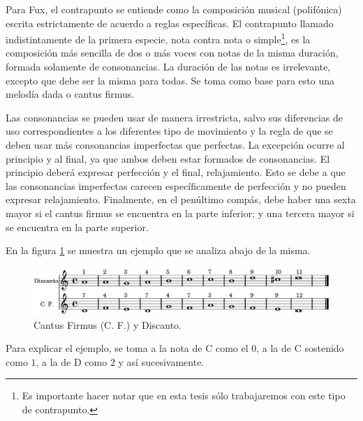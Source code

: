 \documentclass[letterpaper,12pt]{book}
\theoremstyle{definition} \newtheorem{Def}{Definición}[chapter]
\theoremstyle{definition} \newtheorem{Teo}{Teorema}[chapter]
\theoremstyle{definition} \newtheorem{Pro}{Proposición}[chapter]
\theoremstyle{definition} \newtheorem{Lema}{Lema}[chapter]
\begin{document}
Para Fux, el contrapunto se entiende como la composición musical (polifónica) escrita estrictamente de acuerdo a reglas específicas. El contrapunto llamado indistintamente de la primera especie, nota contra nota o simple\footnote{ Es importante hacer notar que en esta tesis sólo trabajaremos con este tipo de contrapunto.}, es la composición más sencilla de dos o más voces con notas de la misma duración, formada solamente de consonancias. La duración de las notas es irrelevante, excepto que debe ser la misma para todas. Se toma como base para esto una melodía dada o cantus firmus.

Las consonancias se pueden usar de manera irrestricta, salvo sus diferencias de uso correspondientes a los diferentes tipo de movimiento y la regla de que se deben usar más consonancias imperfectas que perfectas. La excepción ocurre al principio y al final, ya que ambos deben estar formados de consonancias. El principio deberá expresar perfección y el final, relajamiento. Esto se debe a que las consonancias imperfectas carecen específicamente de perfección y no pueden expresar relajamiento. Finalmente, en el penúltimo compás, debe haber una sexta mayor si el cantus firmus se encuentra en la parte inferior; y una tercera mayor si se encuentra en la parte superior. 

En la figura \ref{Contrapunto} se muestra un ejemplo que se analiza abajo de la misma.

\begin{figure}[h] 
\centering 
\includegraphics[angle=0, width=1\textwidth]{Contrapunto.png} 
\caption{\label{Contrapunto}Cantus Firmus (C. F.) y Discanto.}
\end{figure}

Para explicar el ejemplo, se toma a la nota de C como el $0$, a la de C sostenido como $1$, a la de D como $2$ y así sucesivamente.
\end{document}
